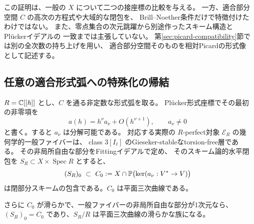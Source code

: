 この証明は、一般の $X$ について二つの接座標の比較を与える。
一方、適合部分空間 $C$ の高次の方程式や大域的な閉包を、
Brill--Noether条件だけで特徴付けたわけではない。
また、零点集合の次元跳躍から別途作ったスキーム構造とPl\"uckerイデアルの
一致までは主張していない。
第\ref{sec:picard-compatibility}節では別の全次数の持ち上げを用い、
適合部分空間そのものを相対Picardの形式像として記述する。

\subsection{任意の適合形式弧への特殊化の帰結}

\begin{theorem}
\label{thm:general-compatible-arc-bn}
$R=\mathbb C[[h]]$ とし、$C$ を通る非定数な形式弧を取る。
Pl\"ucker形式座標でその最初の非零項を
\[
 a(h)=h^\nu a_\nu+O(h^{\nu+1}),\qquad a_\nu\ne0
\]
と書く。すると $a_\nu$ は分解可能である。
対応する実際の $R$-perfect対象 $\mathcal E_R$ の幾何学的一般ファイバーは、
class $3[I_\ell]$ のGieseker-stableなtorsion-free層である。
その非局所自由な部分をFittingイデアルで定め、
そのスキーム論的水平閉包を $S_R\subset X\times\operatorname{Spec}R$ とすると、
\[
 (S_R)_0\ \subset\
 C_0:=X\cap\mathbb P\bigl(\ker(a_\nu:V^*\to V)\bigr)
\]
は閉部分スキームの包含である。$C_0$ は平面三次曲線である。

さらに $C_0$ が滑らかで、一般ファイバーの非局所自由な部分が1次元なら、
$(S_R)_0=C_0$ であり、$S_R/R$ は平面三次曲線の滑らかな族になる。
\end{theorem}

